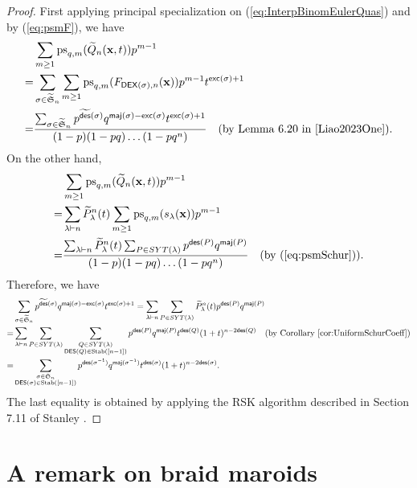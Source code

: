\documentclass[reqno]{amsart}
\newcommand{\DES}{{\mathsf{DES}}}
\newcommand{\des}{{\mathsf{des}}}
\newcommand{\exc}{{\mathsf{exc}}}
\newcommand{\maj}{{\mathsf{maj}}}
\newcommand{\DEX}{{\mathsf{DEX}}}
\newcommand{\psm}{{\mathrm{ps}_{q,m}}}
\newcommand{\Stab}{{\mathrm{Stab}}}
\renewcommand{\S}{{\mathfrak{S}}}
\newcommand{\x}{{\mathbf{x}}}
\theoremstyle{definition}
\theoremstyle{remark}
\begin{document}
\begin{proof}
 First applying principal specialization on (\ref{eq:InterpBinomEulerQuas}) and by (\ref{eq:psmF}), we have
\begin{align*}
    &\sum_{m\ge 1}\psm(\widetilde{Q}_n(\x,t))p^{m-1}\\
    =&\sum_{\sigma\in\widetilde{\S}_n}\sum_{m\ge 1}\psm(F_{\DEX(\sigma),n}(\x))p^{m-1}t^{\exc(\sigma)+1}\\
    =&\frac{\sum_{\sigma\in\widetilde{\S}_n}p^{\widetilde{\des}(\sigma)}q^{\maj(\sigma)-\exc(\sigma)}t^{\exc(\sigma)+1}}{(1-p)(1-pq)\ldots(1-pq^n)} \quad  \text{(by Lemma 6.20 in \cite{Liao2023One})}.
\end{align*}
On the other hand, 
\begin{align*}
    &\sum_{m\ge 1}\psm(\widetilde{Q}_n(\x,t))p^{m-1}\\
    =&\sum_{\lambda\vdash n} \widetilde{P}_{\lambda}^{n}(t)\sum_{m\ge 1}\psm(s_{\lambda}(\x))p^{m-1}\\
    =&\frac{\sum_{\lambda\vdash n} \widetilde{P}_{\lambda}^{n}(t)\sum_{P\in SYT(\lambda)}p^{\des(P)}q^{\maj(P)}}{(1-p)(1-pq)\ldots(1-pq^n)} \quad \text{(by (\ref{eq:psmSchur}))}.
\end{align*}
Therefore, we have 
\begin{align*}
    &\sum_{\sigma\in\widetilde{\S}_n}p^{\widetilde{\des}(\sigma)}q^{\maj(\sigma)-\exc(\sigma)}t^{\exc(\sigma)+1}
    =\sum_{\lambda\vdash n}\sum_{P\in SYT(\lambda)} \widetilde{P}_{\lambda}^{n}(t)p^{\des(P)}q^{\maj(P)}\\
    =&\sum_{\lambda\vdash n}\sum_{P\in SYT(\lambda)}\sum_{\substack{Q\in SYT(\lambda)\\ \DES(Q)\in\Stab([n-1])}}p^{\des(P)}q^{\maj(P)} t^{\des(Q)}(1+t)^{n-2\des(Q)} \quad \text{(by Corollary \ref{cor:UniformSchurCoeff})}\\
    =& \sum_{\substack{\sigma\in\S_n\\ \DES(\sigma)\in\Stab([n-1])}}p^{\des(\sigma^{-1})}q^{\maj(\sigma^{-1})}t^{\des(\sigma)}(1+t)^{n-2\des(\sigma)}.
\end{align*}
The last equality is obtained by applying the RSK algorithm described in Section 7.11 of Stanley \cite[Lemma 7.23.1]{StanleyEC2}.
\end{proof}


\section{A remark on braid maroids} \label{sec: Braid}
\end{document}
